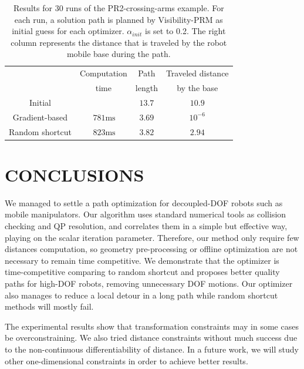 \documentclass{tADR2e}
\begin{document}
\begin{table}[t]
\centering
  \begin{tabular}{cccc}
  \\
  \toprule
     & Computation & Path  & Traveled distance\\
     & time & length & by the base\\
    \midrule
    \midrule
    Initial &  & $13.7$ & $10.9$\\
    Gradient-based & $\,781\text{ms}$ & $3.69$ & $10^{-6}$\\
    Random shortcut & $\,823\text{ms}$ & $3.82$ & $2.94$\\
    \bottomrule
  \end{tabular}
\caption {Results for 30 runs of the PR2-crossing-arms example. For each run, a solution path is planned by Visibility-PRM as initial guess for each optimizer. $\alpha_{init}$ is set to 0.2. The right column represents the distance that is traveled by the robot mobile base during the path.}
\label{tab:results}
\end{table}

\section{CONCLUSIONS}
We managed to settle a path optimization for decoupled-DOF robots such as mobile 
manipulators. Our algorithm uses standard numerical tools as collision checking 
and QP resolution, and correlates them in a 
simple but effective way, playing on the scalar iteration parameter. Therefore, 
our method only require few distances computation, so geometry pre-processing or 
offline optimization are not necessary to remain time competitive. We demonstrate 
that the optimizer is 
time-competitive comparing to random shortcut and proposes better quality paths 
for high-DOF robots, removing unnecessary DOF motions. Our optimizer also manages 
to reduce a local detour in a long path while random shortcut methods will mostly 
fail.

The experimental results show that transformation constraints may in some cases be overconstraining. We also tried distance constraints without much success due to the non-continuous differentiability of distance. In a future work, we will study other one-dimensional constraints in order to achieve better results.


\end{document}
